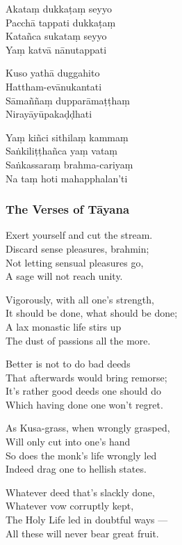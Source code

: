 Akataṃ dukkaṭaṃ seyyo\\
Pacchā tappati dukkaṭaṃ\\
Katañca sukataṃ seyyo\\
Yaṃ katvā nānutappati

Kuso yathā duggahito\\
Hattham-evānukantati\\
Sāmaññaṃ dupparāmaṭṭhaṃ\\
Nirayāyūpakaḍḍhati

Yaṃ kiñci sithilaṃ kammaṃ\\
Saṅkiliṭṭhañca yaṃ vataṃ\\
Saṅkassaraṃ brahma-cariyaṃ\\
Na taṃ hoti mahapphalan'ti


\subsubsection{The Verses of Tāyana}

Exert yourself and cut the stream.\\
Discard sense pleasures, brahmin;\\
Not letting sensual pleasures go,\\
A sage will not reach unity.

Vigorously, with all one's strength,\\
It should be done, what should be done;\\
A lax monastic life stirs up\\
The dust of passions all the more.

Better is not to do bad deeds\\
That afterwards would bring remorse;\\
It's rather good deeds one should do\\
Which having done one won't regret.

As Kusa-grass, when wrongly grasped,\\
Will only cut into one's hand\\
So does the monk's life wrongly led\\
Indeed drag one to hellish states.

Whatever deed that's slackly done,\\
Whatever vow corruptly kept,\\
The Holy Life led in doubtful ways ---\\
All these will never bear great fruit.

